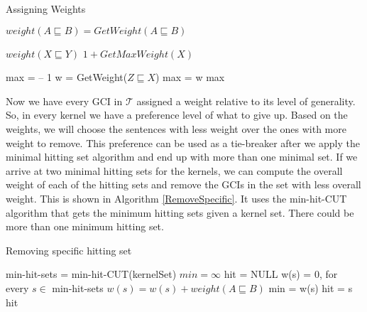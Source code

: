 \begin{algorithm}
\caption{Assigning Weights}
\label{AssignWeights}
\begin{algorithmic}[1]
\State $weight(A \sqsubseteq B) = GetWeight(A \sqsubseteq B)$
\EndFor
\EndFunction
\end{algorithmic}

\begin{algorithmic}[1]
\State
\Return $weight(X \sqsubseteq Y)$
\EndIf
{}
\State
{}
\Else
\State
\Return $1 + GetMaxWeight(X)$
\EndIf
\EndFunction
\end{algorithmic}

\begin{algorithmic}[1]
\State max = -- 1
\State w = GetWeight($Z \sqsubseteq X$)
\State max = w
\EndIf
\EndFor
\State
\Return max
\EndFunction
\end{algorithmic}
\end{algorithm}

Now we have every GCI in $\mathcal{T}$ assigned a weight relative to its level of generality. So, in every kernel we have a preference level of what to give up. Based on the weights, we will choose the sentences with less weight over the ones with more weight to remove. This preference can be used as a tie-breaker after we apply the minimal hitting set algorithm and end up with more than one minimal set. If we arrive at two minimal hitting sets for the kernels, we can compute the overall weight of each of the hitting sets and remove the GCIs in the set with less overall weight. This is shown in Algorithm \ref{RemoveSpecific}. It uses the min-hit-CUT algorithm that gets the minimum hitting sets given a kernel set. There could be more than one minimum hitting set.

\begin{algorithm}
\caption{Removing specific hitting set}
\label{RemoveSpecific}
\begin{algorithmic}[1]
\State min-hit-sets = min-hit-CUT(kernelSet)
\State $min = \infty$
\State hit = NULL
\State w(s) = 0, for every $s \in $ min-hit-sets
\State $w(s) = w(s) + weight(A \sqsubseteq B)$
\EndFor
{}
\State min = w(s)
\State hit = s
\EndIf
\EndFor
\State
\Return hit
\EndFunction
\end{algorithmic}
\end{algorithm}

